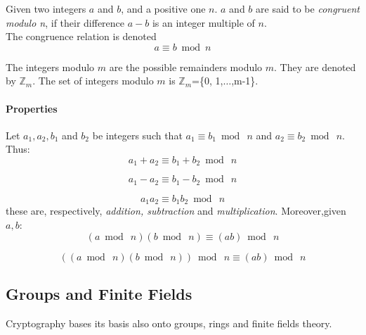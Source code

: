 \begin{teorema}
	Given two integers $a$ and $b$, and a positive one $n$. $a$ and $b$ are said to be \textit{congruent modulo n}, if their difference $a-b$ is an integer multiple of $n$.\\
	The congruence relation is denoted 
	\begin{equation}
	a \equiv b\bmod n
	\end{equation}
\end{teorema}
The integers modulo $m$ are the possible remainders modulo $m$. They are denoted by $\mathbb{Z}_{m}$. The set of integers modulo $m$ is $\mathbb{Z}_{m}$=\{0, 1,$\dots$,m-1\}.

\paragraph{Properties}
Let $a_{1}, a_{2}, b_{1}$ and $b_{2}$ be integers such that $a_{1}\equiv b_{1}\bmod\ n$ and $a_{2}\equiv b_{2}\bmod\ n$. Thus:
\begin{equation}
	a_{1}+a_{2}\equiv b_{1}+b_{2}\bmod\ n
\end{equation}

\begin{equation}
	a_{1}-a_{2}\equiv b_{1}-b_{2}\bmod\ n
\end{equation}

\begin{equation}
	a_{1}a_{2}\equiv b_{1}b_{2}\bmod\ n
\end{equation}
these are, respectively, \textit{addition, subtraction} and \textit{multiplication}.
Moreover,given $a,b$:
\begin{equation}
	(a\bmod\ n)(b\bmod\ n)\equiv (ab)\bmod\ n
\end{equation}

\begin{equation}
	((a\bmod\ n)(b\bmod\ n))\bmod\ n\equiv (ab)\bmod\ n
\end{equation}

\subsection{Groups and Finite Fields}
Cryptography bases its basis also onto groups, rings and finite fields theory.

